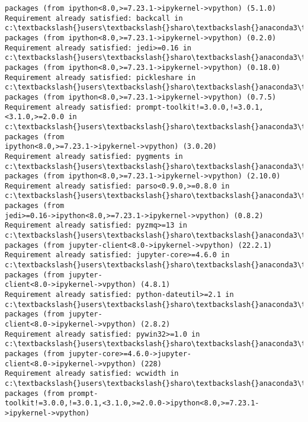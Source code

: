 \documentclass[11pt]{article}
\begin{document}
\begin{Verbatim}[commandchars=\\\{\}]
packages (from ipython<8.0,>=7.23.1->ipykernel->vpython) (5.1.0)
Requirement already satisfied: backcall in c:\textbackslash{}users\textbackslash{}sharo\textbackslash{}anaconda3\textbackslash{}lib\textbackslash{}site-
packages (from ipython<8.0,>=7.23.1->ipykernel->vpython) (0.2.0)
Requirement already satisfied: jedi>=0.16 in c:\textbackslash{}users\textbackslash{}sharo\textbackslash{}anaconda3\textbackslash{}lib\textbackslash{}site-
packages (from ipython<8.0,>=7.23.1->ipykernel->vpython) (0.18.0)
Requirement already satisfied: pickleshare in c:\textbackslash{}users\textbackslash{}sharo\textbackslash{}anaconda3\textbackslash{}lib\textbackslash{}site-
packages (from ipython<8.0,>=7.23.1->ipykernel->vpython) (0.7.5)
Requirement already satisfied: prompt-toolkit!=3.0.0,!=3.0.1,<3.1.0,>=2.0.0 in
c:\textbackslash{}users\textbackslash{}sharo\textbackslash{}anaconda3\textbackslash{}lib\textbackslash{}site-packages (from
ipython<8.0,>=7.23.1->ipykernel->vpython) (3.0.20)
Requirement already satisfied: pygments in c:\textbackslash{}users\textbackslash{}sharo\textbackslash{}anaconda3\textbackslash{}lib\textbackslash{}site-
packages (from ipython<8.0,>=7.23.1->ipykernel->vpython) (2.10.0)
Requirement already satisfied: parso<0.9.0,>=0.8.0 in
c:\textbackslash{}users\textbackslash{}sharo\textbackslash{}anaconda3\textbackslash{}lib\textbackslash{}site-packages (from
jedi>=0.16->ipython<8.0,>=7.23.1->ipykernel->vpython) (0.8.2)
Requirement already satisfied: pyzmq>=13 in c:\textbackslash{}users\textbackslash{}sharo\textbackslash{}anaconda3\textbackslash{}lib\textbackslash{}site-
packages (from jupyter-client<8.0->ipykernel->vpython) (22.2.1)
Requirement already satisfied: jupyter-core>=4.6.0 in
c:\textbackslash{}users\textbackslash{}sharo\textbackslash{}anaconda3\textbackslash{}lib\textbackslash{}site-packages (from jupyter-
client<8.0->ipykernel->vpython) (4.8.1)
Requirement already satisfied: python-dateutil>=2.1 in
c:\textbackslash{}users\textbackslash{}sharo\textbackslash{}anaconda3\textbackslash{}lib\textbackslash{}site-packages (from jupyter-
client<8.0->ipykernel->vpython) (2.8.2)
Requirement already satisfied: pywin32>=1.0 in
c:\textbackslash{}users\textbackslash{}sharo\textbackslash{}anaconda3\textbackslash{}lib\textbackslash{}site-packages (from jupyter-core>=4.6.0->jupyter-
client<8.0->ipykernel->vpython) (228)
Requirement already satisfied: wcwidth in c:\textbackslash{}users\textbackslash{}sharo\textbackslash{}anaconda3\textbackslash{}lib\textbackslash{}site-
packages (from prompt-
toolkit!=3.0.0,!=3.0.1,<3.1.0,>=2.0.0->ipython<8.0,>=7.23.1->ipykernel->vpython)

\end{Verbatim}
\end{document}
